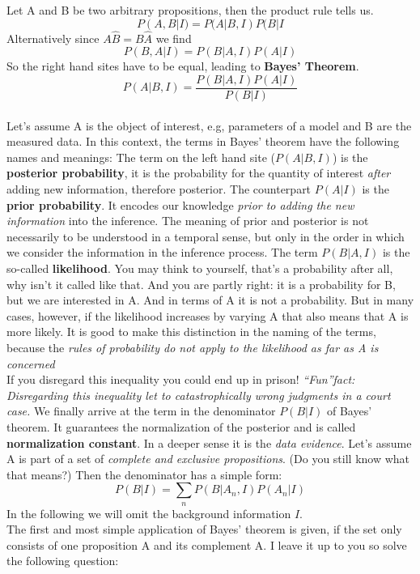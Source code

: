 \documentclass[12pt, a4paper]{scrartcl}
\begin{document}
Let A and B be two arbitrary propositions, then the product rule tells us. \[P(A,B|I)=P(A|B,I)P(B|I\]
Alternatively since $A\hat B=B\hat A$ we ﬁnd \[P(B,A|I)=P(B|A,I)P(A|I)\]
So the right hand sites have to be equal, leading to \textbf{Bayes’ Theorem}.
\begin{equation*}\boxed{P(A|B,I)=\frac{P(B|A,I)P(A|I)}{P(B|I)}
}\end{equation*}\\
Let’s assume A is the object of interest, e.g, parameters of a model and B
are the measured data. In this context, the terms in Bayes’ theorem have
the following names and meanings:
The term on the left hand site ($P(A|B,I)$) is the \textbf{posterior probability},
it is the probability for the quantity of interest \textit{after} adding new
information, therefore posterior.
The counterpart $P(A|I)$ is the \textbf{prior probability}. It encodes our
knowledge \textit{prior to adding the new information} into the inference.
The meaning of prior and posterior is not necessarily to be understood
in a temporal sense, but only in the order in which we consider the
information in the inference process.
The term $P(B|A,I)$
 is the so-called \textbf{likelihood}. You may think to
yourself, that’s a probability after all, why isn’t it called like that. And you
are partly right: it is a probability for B, but we are interested in A.
And in terms of A it is not a probability.
But in many cases, however, if the likelihood increases by varying A
that also means that A is more likely.
It is good to make this distinction in the naming of the terms, because
the\textit{ rules of probability do not apply to the likelihood as far as A is
concerned}\\
If you disregard this inequality you could end up in prison!
\textit{``Fun''fact: Disregarding this inequality let to catastrophically wrong judgments in a court case. }%
We ﬁnally arrive at the term in the denominator $P(B|I)$ of Bayes’ theorem.
It guarantees the normalization of the posterior and is called \textbf{normalization constant}. 
In a deeper sense it is the \textit{data evidence}.
Let’s assume A is part of a set of \textit{complete
and exclusive propositions}. (Do you still know what that means?) Then
the denominator has a simple form:
\[P(B|I)=\sum_nP(B|A_n,I)P(A_n|I)\]
In the following we will omit the background information $I$.\\

The ﬁrst and most simple application of Bayes’ theorem is given, if the set
only consists of one proposition A and its complement A. I leave it up to
you so solve the following question:\\
\end{document}
